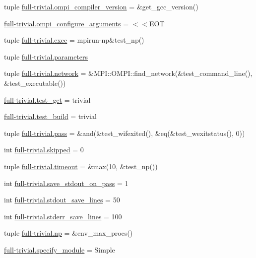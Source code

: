 \begin{DoxyCompactItemize}
tuple \hyperlink{namespacefull-trivial_ae61160048d266c12c817f0c990b0b41b}{full-\/trivial.\-ompi\-\_\-compiler\-\_\-version} = \&get\-\_\-gcc\-\_\-version()
\item 
\hyperlink{namespacefull-trivial_ad846b3615dd310ecef321a446f558151}{full-\/trivial.\-ompi\-\_\-configure\-\_\-arguments} = $<$$<$E\-O\-T
\item 
tuple \hyperlink{namespacefull-trivial_a96c49e3c0c2dc3c6f9dbf27fe22ff837}{full-\/trivial.\-exec} = mpirun-\/np\&test\-\_\-np()
\item 
tuple \hyperlink{namespacefull-trivial_a6513f5e0f867d0312f10064a0adb1740}{full-\/trivial.\-parameters}
\item 
tuple \hyperlink{namespacefull-trivial_aec768b574435ba99bb3d8737549d08e5}{full-\/trivial.\-network} = \&M\-P\-I\-::\-O\-M\-P\-I\-::find\-\_\-network(\&test\-\_\-command\-\_\-line(), \&test\-\_\-executable())
\item 
\hyperlink{namespacefull-trivial_a3973918af8b0679a239a862cdc097804}{full-\/trivial.\-test\-\_\-get} = trivial
\item 
\hyperlink{namespacefull-trivial_aa09bcc003045dcca018f705fcea70f0f}{full-\/trivial.\-test\-\_\-build} = trivial
\item 
tuple \hyperlink{namespacefull-trivial_a47d8fbeff54aeee0210d2f5d55d4fc75}{full-\/trivial.\-pass} = \&and(\&test\-\_\-wifexited(), \&eq(\&test\-\_\-wexitstatus(), 0))
\item 
int \hyperlink{namespacefull-trivial_a119af101bc6d9cb4061ffea6b4187230}{full-\/trivial.\-skipped} = 0
\item 
tuple \hyperlink{namespacefull-trivial_a87b2271fca0c5c5553c1a20d8ee1c11d}{full-\/trivial.\-timeout} = \&max(10, \&test\-\_\-np())
\item 
int \hyperlink{namespacefull-trivial_a648cfc9aa4be2d29a9b2cc7fa66a99de}{full-\/trivial.\-save\-\_\-stdout\-\_\-on\-\_\-pass} = 1
\item 
int \hyperlink{namespacefull-trivial_a701f09db43ab9e43a49aaf76aa97b131}{full-\/trivial.\-stdout\-\_\-save\-\_\-lines} = 50
\item 
int \hyperlink{namespacefull-trivial_ab88dfbf498ed0d90e1a0510bbbb706fa}{full-\/trivial.\-stderr\-\_\-save\-\_\-lines} = 100
\item 
tuple \hyperlink{namespacefull-trivial_acf328fb05e5f171cd49e3b6930f21f2f}{full-\/trivial.\-np} = \&env\-\_\-max\-\_\-procs()
\item 
\hyperlink{namespacefull-trivial_a8845e5ef8465c334338eba7b42c0c61c}{full-\/trivial.\-specify\-\_\-module} = Simple
$$
\end{DoxyCompactItemize}
